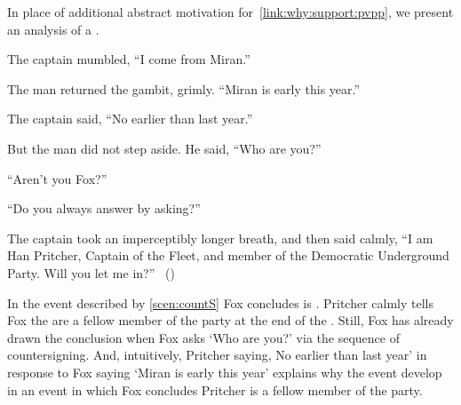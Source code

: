 \begin{note}
  In place of additional abstract motivation for~\autoref{link:why:support:pvpp}, we present an analysis of a .

  \begin{scenario}[Countersign]
    \label{scen:countS}
    \indent The captain mumbled, ``I come from Miran.''

    The man returned the gambit, grimly.
    ``Miran is early this year.''

    The captain said, ``No earlier than last year.''

    But the man did not step aside.
    He said, ``Who are you?''

    ``Aren't you Fox?''

    ``Do you always answer by asking?''

    The captain took an imperceptibly longer breath, and then said calmly,
    ``I am Han Pritcher, Captain of the Fleet, and member of the Democratic Underground Party.
    Will you let me in?''%
    \mbox{ }\hfill\mbox{(\cite[70]{Asimov:1945aa})}%
    \newline
  \end{scenario}

  \noindent%
  In the event described by \autoref{scen:countS} Fox concludes  is .
  Pritcher calmly tells Fox the are a fellow member of the party at the end of the \scen{}.
  Still, Fox has already drawn the conclusion when Fox asks `Who are you?' via the sequence of countersigning.
  And, intuitively, Pritcher saying, No earlier than last year' in response to Fox saying `Miran is early this year' explains why the event develop in an event in which Fox concludes Pritcher is a fellow member of the party.


\end{note}
